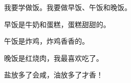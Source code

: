 \documentclass[12pt,UTF-8,openany]{ctexbook}
\begin{document}
\begin{large}
    
    我要学做饭。我要做早饭、午饭和晚饭。
    
    早饭是牛奶和蛋糕，蛋糕甜甜的。
    
    午饭是炸鸡，炸鸡香香的。
    
    晚饭是红烧肉，我最喜欢吃了。
    
    盐放多了会咸，油放多了才香！
    
\end{large}


\clearpage

\begin{center}
    
\end{center}


\hanzibox{}\hanzibox{}\hanzibox{}\hanzibox{}\hspace{1em}\hanzibox{}\hanzibox{}\hanzibox{}\hanzibox{}

\hanzibox{}\hanzibox{}\hanzibox{}\hanzibox{}\hspace{1em}\hanzibox{}\hanzibox{}\hanzibox{}\hanzibox{}

\hanzibox{}\hanzibox{}\hanzibox{}\hanzibox{}\hspace{1em}\hanzibox{}\hanzibox{}\hanzibox{}\hanzibox{}

\hanzibox{}\hanzibox{}\hanzibox{}\hanzibox{}\hspace{1em}
\end{document}
